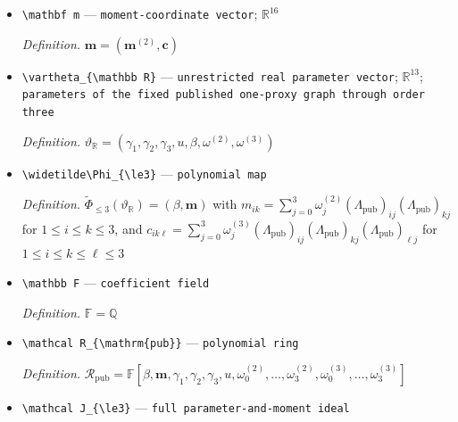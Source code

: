 \documentclass{article}
\begin{document}
\begin{itemize}
  \par\smallskip\noindent\emph{Definition.} \(\mathbf c=(c_{111},c_{112},c_{113},c_{122},c_{123},c_{133},c_{222},c_{223},c_{233},c_{333})\), where \(c_{ijk}=C_{ijk}\) for \(1\le i\le j\le k\le3\)
  \item \texttt{\textbackslash{}\allowbreak{}mathbf m} --- \texttt{moment-\allowbreak{}coordinate vector}; \(\mathbb R^{16}\)
  \par\smallskip\noindent\emph{Definition.} \(\mathbf m=(\mathbf m^{(2)},\mathbf c)\)
  \item \texttt{\textbackslash{}\allowbreak{}vartheta\_\allowbreak{}\{\textbackslash{}\allowbreak{}mathbb R\}\allowbreak{}} --- \texttt{unrestricted real parameter vector}; \(\mathbb R^{13}\); \texttt{parameters of the fixed published one-\allowbreak{}proxy graph through order three}
  \par\smallskip\noindent\emph{Definition.} \(\vartheta_{\mathbb R}=(\gamma_1,\gamma_2,\gamma_3,u,\beta,\omega^{(2)},\omega^{(3)})\)
  \item \texttt{\textbackslash{}\allowbreak{}widetilde\textbackslash{}\allowbreak{}Phi\_\allowbreak{}\{\textbackslash{}\allowbreak{}le3\}\allowbreak{}} --- \texttt{polynomial map}
  \par\smallskip\noindent\emph{Definition.} \(\widetilde\Phi_{\le3}(\vartheta_{\mathbb R})=(\beta,\mathbf m)\) with \(m_{ik}=\sum_{j=0}^3\omega_j^{(2)}(\Lambda_{\mathrm{pub}})_{ij}(\Lambda_{\mathrm{pub}})_{kj}\) for \(1\le i\le k\le3\), and \(c_{ik\ell}=\sum_{j=0}^3\omega_j^{(3)}(\Lambda_{\mathrm{pub}})_{ij}(\Lambda_{\mathrm{pub}})_{kj}(\Lambda_{\mathrm{pub}})_{\ell j}\) for \(1\le i\le k\le\ell\le3\)
  \item \texttt{\textbackslash{}\allowbreak{}mathbb F} --- \texttt{coefficient field}
  \par\smallskip\noindent\emph{Definition.} \(\mathbb F=\mathbb Q\)
  \item \texttt{\textbackslash{}\allowbreak{}mathcal R\_\allowbreak{}\{\textbackslash{}\allowbreak{}mathrm\{pub\}\allowbreak{}\}\allowbreak{}} --- \texttt{polynomial ring}
  \par\smallskip\noindent\emph{Definition.} \(\mathcal R_{\mathrm{pub}}=\mathbb F[\beta,\mathbf m,\gamma_1,\gamma_2,\gamma_3,u,\omega^{(2)}_0,\ldots,\omega^{(2)}_3,\omega^{(3)}_0,\ldots,\omega^{(3)}_3]\)
  \item \texttt{\textbackslash{}\allowbreak{}mathcal J\_\allowbreak{}\{\textbackslash{}\allowbreak{}le3\}\allowbreak{}} --- \texttt{full parameter-\allowbreak{}and-\allowbreak{}moment ideal}

\end{itemize}
\end{document}
